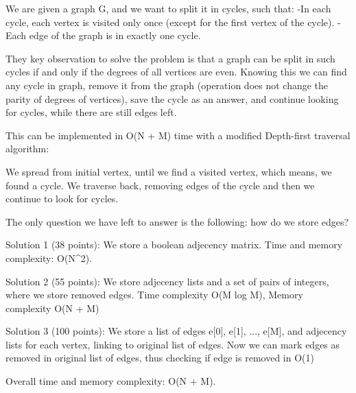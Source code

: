 
We are given a graph G, and we want to split it in cycles, such that:
 -In each cycle, each vertex is visited only once (except for the first vertex of the cycle).
 -Each edge of the graph is in exactly one cycle. 

They key observation to solve the problem is that a graph can be split in such cycles if and only if
the degrees of all vertices are even. Knowing this we can find any cycle in graph, remove it from the graph
(operation does not change the parity of degrees of vertices), save the cycle as an answer, and continue
looking for cycles, while there are still edges left. 

This can be implemented in O(N + M) time with a modified Depth-first traversal algorithm:

We spread from initial vertex, until we find a visited vertex, which means, we found a cycle. We
traverse back, removing edges of the cycle and then we continue to look for cycles. 

The only question we have left to answer is the following: how do we store edges?

Solution 1 (38 points):
We store a boolean adjecency matrix.
Time and memory complexity: O(N^2).

Solution 2 (55 points):
We store adjecency lists and a set of pairs of integers, where we store removed edges. 
Time complexity O(M log M), Memory complexity O(N + M)

Solution 3 (100 points):
We store a list of edges e[0], e[1], ..., e[M], and adjecency lists for each vertex, 
linking to original list of edges. Now we can mark edges as removed in original list
of edges, thus checking if edge is removed in O(1)

Overall time and memory complexity: O(N + M).

